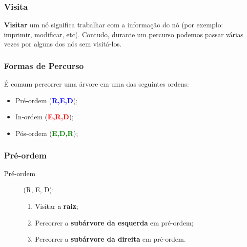 \documentclass{beamer}
\newcommand{\tcb}[1]{\textcolor{blue}{\textbf{#1}}}
\newcommand{\tcg}[1]{\textcolor{green}{\textbf{#1}}}
\newcommand{\tcr}[1]{\textcolor{red}{\textbf{#1}}}
\begin{document}
\begin{frame}
  \frametitle{Visita}

  \textbf{Visitar} um nó significa trabalhar com
a informação do nó (por exemplo: imprimir, modificar, etc). Contudo, 
durante um percurso podemos passar várias vezes por alguns dos nós sem
visitá-los.
\end{frame}


\begin{frame}
  \frametitle{Formas de Percurso}

  É comum percorrer uma árvore em uma das seguintes ordens:
  \begin{itemize}
    \item Pré-ordem (\tcb{R,E,D});
    \item In-ordem (\tcr{E,R,D});
    \item Pós-ordem (\tcg{E,D,R});
  \end{itemize}

\end{frame}

\begin{frame}
  \frametitle{Pré-ordem}

  \begin{description}
    \item [Pré-ordem] (R, E, D):
    \begin{enumerate}
      \item Visitar a \textbf{raiz};
      \item Percorrer a \textbf{subárvore da esquerda} em pré-ordem;
      \item Percorrer a \textbf{subárvore da direita} em pré-ordem.
    \end{enumerate}
  \end{description}
  
\end{frame}
\end{document}
